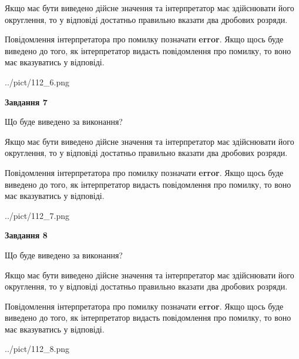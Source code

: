 \documentclass[12pt, ukrainian]{article}
\begin{document}
{\begin {Large}
Якщо має бути виведено дійсне значення та інтерпретатор має здійснювати його округлення, 
то у відповіді достатньо правильно вказати два дробових розряди.

Повідомлення інтерпретатора про помилку позначати \textbf{error}.
Якщо щось буде виведено до того, як інтерпретатор видасть повідомлення про помилку, 
то воно має вказуватись у відповіді. \par

\begin{center}
	{../pict/112_6.png}
\end{center}
\newpage

{\begin {center}\textbf{Завдання 7}\end {center}}\par
Що буде виведено за виконання? \par

Якщо має бути виведено дійсне значення та інтерпретатор має здійснювати його округлення, 
то у відповіді достатньо правильно вказати два дробових розряди.

Повідомлення інтерпретатора про помилку позначати \textbf{error}.
Якщо щось буде виведено до того, як інтерпретатор видасть повідомлення про помилку, 
то воно має вказуватись у відповіді. \par

\begin{center}
	{../pict/112_7.png}
\end{center}
\newpage

{\begin {center}\textbf{Завдання 8}\end {center}}\par
Що буде виведено за виконання? \par

Якщо має бути виведено дійсне значення та інтерпретатор має здійснювати його округлення, 
то у відповіді достатньо правильно вказати два дробових розряди.

Повідомлення інтерпретатора про помилку позначати \textbf{error}.
Якщо щось буде виведено до того, як інтерпретатор видасть повідомлення про помилку, 
то воно має вказуватись у відповіді. \par

\begin{center}
	{../pict/112_8.png}
\end{center}
\newpage


\end{Large}}
\end{document}

